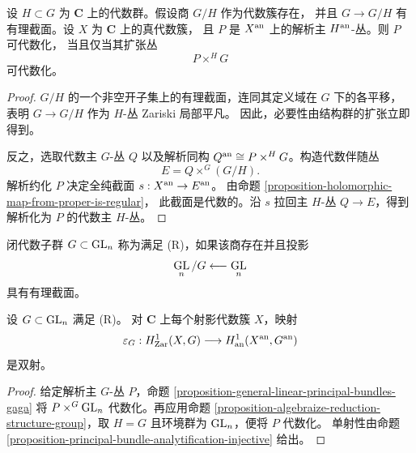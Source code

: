 \begin{proposition}[结构群约化的代数化]
\label{proposition-algebraize-reduction-structure-group}
\begin{reference}
\cite[\S 4，第 20 号，命题 19]{GAGA}
\end{reference}
设 $H\subset G$ 为 $\mathbf C$ 上的代数群。假设商 $G/H$ 作为代数簇存在，
并且 $G\to G/H$ 有有理截面。设 $X$ 为 $\mathbf C$ 上的真代数簇，
且 $P$ 是 $X^{\rm an}$ 上的解析主 $H^{\rm an}$-丛。则 $P$ 可代数化，
当且仅当其扩张丛
$$
P\times^H G
$$
可代数化。
\end{proposition}

\begin{proof}
$G/H$ 的一个非空开子集上的有理截面，连同其定义域在 $G$ 下的各平移，
表明 $G\to G/H$ 作为 $H$-丛 Zariski 局部平凡。
因此，必要性由结构群的扩张立即得到。

反之，选取代数主 $G$-丛 $Q$ 以及解析同构
$Q^{\rm an}\cong P\times^H G$。构造代数伴随丛
$$
E=Q\times^G(G/H).
$$
解析约化 $P$ 决定全纯截面 $s:X^{\rm an}\to E^{\rm an}$。
由命题 \ref{proposition-holomorphic-map-from-proper-is-regular}，
此截面是代数的。沿 $s$ 拉回主 $H$-丛 $Q\to E$，得到解析化为 $P$
的代数主 $H$-丛。
\end{proof}

\begin{definition}
\label{definition-rational-section-condition}
\begin{reference}
\cite[\S 4，第 20 号，条件 (R)]{GAGA}
\end{reference}
闭代数子群 $G\subset\mathop{\rm GL}_n$ 称为满足
\textup{(R)}，如果该商存在并且投影
$$
\mathop{\rm GL}_n/G\longleftarrow\mathop{\rm GL}_n
$$
具有有理截面。
\end{definition}

\begin{proposition}
\label{proposition-rational-section-principal-bundles-gaga}
\begin{reference}
\cite[\S 4，第 20 号，命题 20]{GAGA}
\end{reference}
设 $G\subset\mathop{\rm GL}_n$ 满足 \textup{(R)}。
对 $\mathbf C$ 上每个射影代数簇 $X$，映射
$$
\varepsilon_G:H^1_{\rm Zar}(X,G)
\longrightarrow H^1_{\rm an}(X^{\rm an},G^{\rm an})
$$
是双射。
\end{proposition}

\begin{proof}
给定解析主 $G$-丛 $P$，命题
\ref{proposition-general-linear-principal-bundles-gaga}
将 $P\times^G\mathop{\rm GL}_n$ 代数化。再应用命题
\ref{proposition-algebraize-reduction-structure-group}，取 $H=G$
且环境群为 $\mathop{\rm GL}_n$，便将 $P$ 代数化。
单射性由命题 \ref{proposition-principal-bundle-analytification-injective} 给出。
\end{proof}

